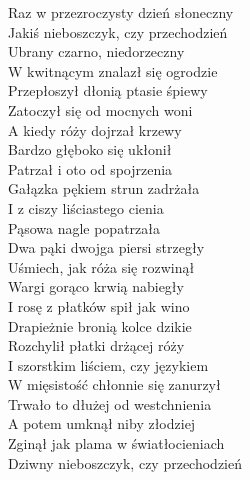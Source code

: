 
Raz w przezroczysty dzień słoneczny  \\
Jakiś nieboszczyk, czy przechodzień  \\
Ubrany czarno, niedorzeczny \tab{}\\
W kwitnącym znalazł się ogrodzie \\
Przepłoszył dłonią ptasie śpiewy  \\
Zatoczył się od mocnych woni \tab{} \\
A kiedy róży dojrzał krzewy \tab{} \\
Bardzo głęboko się ukłonił \tab{} \\
\hops
Patrzał i oto od spojrzenia \\
Gałązka pękiem strun zadrżała \\
I z ciszy liściastego cienia \\
Pąsowa nagle popatrzała \\
Dwa pąki dwojga piersi strzegły \\
Uśmiech, jak róża się rozwinął \\
Wargi gorąco krwią nabiegły \\
I rosę z płatków spił jak wino \\
\hops
Drapieżnie bronią kolce dzikie \\
Rozchylił płatki drżącej róży \\
I szorstkim liściem, czy językiem  \\
W mięsistość chłonnie się zanurzył \\
Trwało to dłużej od westchnienia  \\
A potem umknął niby złodziej \\
Zginął jak plama w światłocieniach  \\
Dziwny nieboszczyk, czy przechodzień